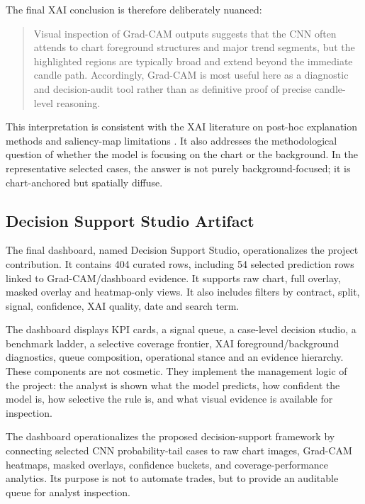 The final XAI conclusion is therefore deliberately nuanced:

\begin{quote}
Visual inspection of Grad-CAM outputs suggests that the CNN often attends to chart foreground structures and major trend segments, but the highlighted regions are typically broad and extend beyond the immediate candle path. Accordingly, Grad-CAM is most useful here as a diagnostic and decision-audit tool rather than as definitive proof of precise candle-level reasoning.
\end{quote}

This interpretation is consistent with the XAI literature on post-hoc explanation methods and saliency-map limitations \cite{selvaraju_gradcam,adebayo_sanity_checks,rudin_black_boxes,guidotti_survey,adadi_berrada_xai,arrieta_xai,lipton_mythos,miller_explanation}. It also addresses the methodological question of whether the model is focusing on the chart or the background. In the representative selected cases, the answer is not purely background-focused; it is chart-anchored but spatially diffuse.

\subsection{Decision Support Studio Artifact}
\label{subsec:dashboard_results}

The final dashboard, named Decision Support Studio, operationalizes the project contribution. It contains 404 curated rows, including 54 selected prediction rows linked to Grad-CAM/dashboard evidence. It supports raw chart, full overlay, masked overlay and heatmap-only views. It also includes filters by contract, split, signal, confidence, XAI quality, date and search term.

The dashboard displays KPI cards, a signal queue, a case-level decision studio, a benchmark ladder, a selective coverage frontier, XAI foreground/background diagnostics, queue composition, operational stance and an evidence hierarchy. These components are not cosmetic. They implement the management logic of the project: the analyst is shown what the model predicts, how confident the model is, how selective the rule is, and what visual evidence is available for inspection.

The dashboard operationalizes the proposed decision-support framework by connecting selected CNN probability-tail cases to raw chart images, Grad-CAM heatmaps, masked overlays, confidence buckets, and coverage-performance analytics. Its purpose is not to automate trades, but to provide an auditable queue for analyst inspection.

